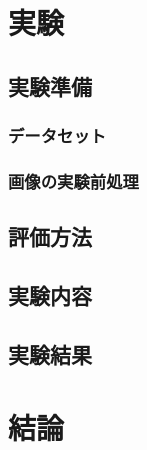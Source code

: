 \chapter{実験}
\section{実験準備}
\subsection{データセット}
\subsection{画像の実験前処理}

\section{評価方法}

\section{実験内容}

\section{実験結果}

\chapter{結論}

